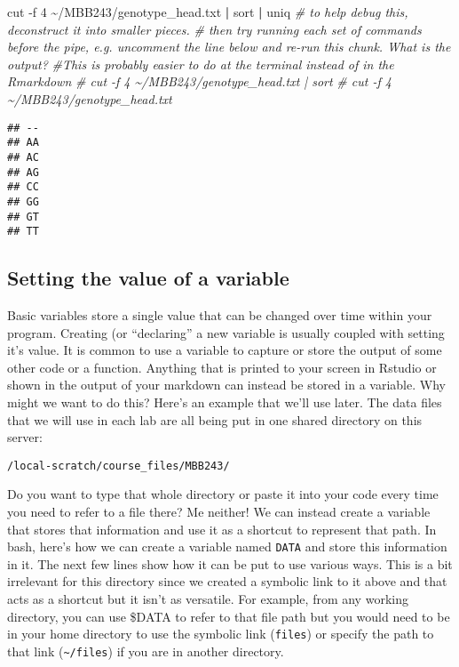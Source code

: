 \documentclass[
]{article}
\newenvironment{Shaded}{\begin{snugshade}}{\end{snugshade}}
\newcommand{\AttributeTok}[1]{\textcolor[rgb]{0.77,0.63,0.00}{#1}}
\newcommand{\CommentTok}[1]{\textcolor[rgb]{0.56,0.35,0.01}{\textit{#1}}}
\newcommand{\FunctionTok}[1]{\textcolor[rgb]{0.00,0.00,0.00}{#1}}
\newcommand{\KeywordTok}[1]{\textcolor[rgb]{0.13,0.29,0.53}{\textbf{#1}}}
\newcommand{\NormalTok}[1]{#1}
\begin{document}
\begin{Shaded}
\begin{Highlighting}[]
\FunctionTok{cut} \AttributeTok{{-}f}\NormalTok{ 4 \textasciitilde{}/MBB243/genotype\_head.txt }\KeywordTok{|} \FunctionTok{sort} \KeywordTok{|} \FunctionTok{uniq}
\CommentTok{\# to help debug this, deconstruct it into smaller pieces.}
\CommentTok{\# then try running each set of commands before the pipe, e.g. uncomment the line below and re{-}run this chunk. What is the output?  }
\CommentTok{\#This is probably easier to do at the terminal instead of in the Rmarkdown}
\CommentTok{\# cut {-}f 4 \textasciitilde{}/MBB243/genotype\_head.txt | sort }
\CommentTok{\# cut {-}f 4 \textasciitilde{}/MBB243/genotype\_head.txt }
\end{Highlighting}
\end{Shaded}

\begin{verbatim}
## --
## AA
## AC
## AG
## CC
## GG
## GT
## TT
\end{verbatim}

\hypertarget{setting-the-value-of-a-variable}{%
\subsection{Setting the value of a
variable}\label{setting-the-value-of-a-variable}}

Basic variables store a single value that can be changed over time
within your program. Creating (or ``declaring'' a new variable is
usually coupled with setting it's value. It is common to use a variable
to capture or store the output of some other code or a function.
Anything that is printed to your screen in Rstudio or shown in the
output of your markdown can instead be stored in a variable. Why might
we want to do this? Here's an example that we'll use later. The data
files that we will use in each lab are all being put in one shared
directory on this server:

\texttt{/local-scratch/course\_files/MBB243/}

Do you want to type that whole directory or paste it into your code
every time you need to refer to a file there? Me neither! We can instead
create a variable that stores that information and use it as a shortcut
to represent that path. In bash, here's how we can create a variable
named \texttt{DATA} and store this information in it. The next few lines
show how it can be put to use various ways. This is a bit irrelevant for
this directory since we created a symbolic link to it above and that
acts as a shortcut but it isn't as versatile. For example, from any
working directory, you can use \$DATA to refer to that file path but you
would need to be in your home directory to use the symbolic link
(\texttt{files}) or specify the path to that link
(\texttt{\textasciitilde{}/files}) if you are in another directory.
\end{document}
